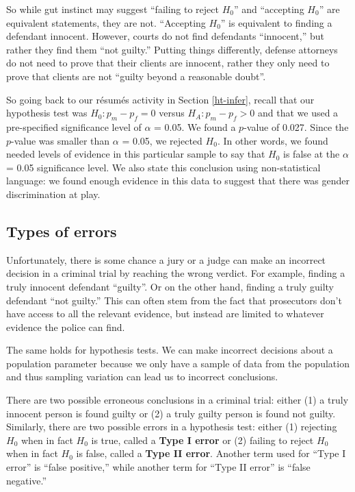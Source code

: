 \documentclass[
]{book}
\begin{document}
So while gut instinct may suggest ``failing to reject \(H_0\)'' and ``accepting \(H_0\)'' are equivalent statements, they are not. ``Accepting \(H_0\)'' is equivalent to finding a defendant innocent. However, courts do not find defendants ``innocent,'' but rather they find them ``not guilty.'' Putting things differently, defense attorneys do not need to prove that their clients are innocent, rather they only need to prove that clients are not ``guilty beyond a reasonable doubt''.

So going back to our résumés activity in Section \ref{ht-infer}, recall that our hypothesis test was \(H_0: p_{m} - p_{f} = 0\) versus \(H_A: p_{m} - p_{f} > 0\) and that we used a pre-specified significance level of \(\alpha\) = 0.05. We found a \(p\)-value of 0.027. Since the \(p\)-value was smaller than \(\alpha\) = 0.05, we rejected \(H_0\). In other words, we found needed levels of evidence in this particular sample to say that \(H_0\) is false at the \(\alpha\) = 0.05 significance level. We also state this conclusion using non-statistical language: we found enough evidence in this data to suggest that there was gender discrimination at play.

\hypertarget{types-of-errors}{%
\subsection{Types of errors}\label{types-of-errors}}

Unfortunately, there is some chance a jury or a judge can make an incorrect decision in a criminal trial by reaching the wrong verdict. For example, finding a truly innocent defendant ``guilty''. Or on the other hand, finding a truly guilty defendant ``not guilty.'' This can often stem from the fact that prosecutors don't have access to all the relevant evidence, but instead are limited to whatever evidence the police can find.

The same holds for hypothesis tests. We can make incorrect decisions about a population parameter because we only have a sample of data from the population and thus sampling variation can lead us to incorrect conclusions.

There are two possible erroneous conclusions in a criminal trial: either (1) a truly innocent person is found guilty or (2) a truly guilty person is found not guilty. Similarly, there are two possible errors in a hypothesis test: either (1) rejecting \(H_0\) when in fact \(H_0\) is true, called a \textbf{Type I error}  or (2) failing to reject \(H_0\) when in fact \(H_0\) is false, called a  \textbf{Type II error}. Another term used for ``Type I error'' is ``false positive,'' while another term for ``Type II error'' is ``false negative.''
\end{document}
